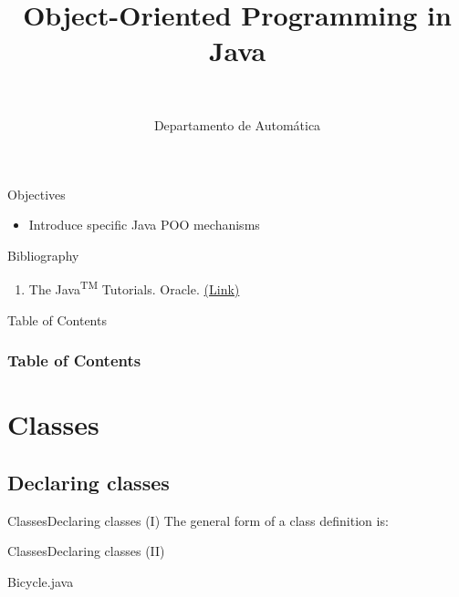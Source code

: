 \documentclass[10pt,compress]{beamer} %
\title[OOP concepts]{Object-Oriented Programming in Java}
\author{\asignatura\\\carrera}
\institute{}
\date{Departamento de Automática}
\begin{document}
{\titlepageBlue
    \begin{frame}
        \titlepage
    \end{frame}
}

\institute{\asignatura}

\begin{frame}[plain]{}
   \begin{block}{Objectives}
      \begin{itemize}
         \item Introduce specific Java POO mechanisms
      \end{itemize} 
   \end{block}

   \begin{block}{Bibliography}
      \begin{enumerate}
          \item The Java\textsuperscript{TM} Tutorials. Oracle. \href{https://docs.oracle.com/javase/tutorial/}{(Link)}
      \end{enumerate} 
   \end{block}
\end{frame}

{
\begin{frame}[shrink]{Table of Contents}
 \frametitle{Table of Contents}
 \tableofcontents
\end{frame}
}

\section{Classes}
\subsection{Declaring classes}

\begin{frame}{Classes}{Declaring classes (I)}
		The general form of a class definition is:
		\bigskip
		\vspace{-0.3cm}
			
\end{frame}

\begin{frame}[shrink]{Classes}{Declaring classes (II)}
		\vspace{-0.3cm}
		\begin{block}{Bicycle.java}
		\vspace{-0.3cm}
			
		\end{block}
\end{frame}
\end{document}
